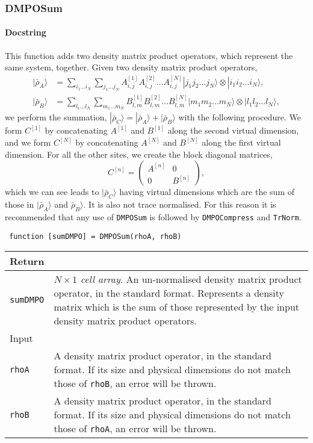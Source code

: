  \subsubsection{DMPOSum}
 \paragraph{Docstring} This function adds two density matrix product operators, which represent the same system, together. Given two density matrix product operators, 
 \begin{align}
 |\bar{\rho}_{A} \rangle &= \sum_{i_{1}\ldots i_{N}} \sum_{j_{1} \ldots j_{N}} A^{[1]}_{i,j} A^{[2]}_{i,j} \ldots A^{[N]}_{i,j} |j_{1} j_{2} \ldots j_{N} \rangle \otimes |i_{1} i_{2} \ldots i_{N} \rangle, \label{eq:vs3-5} \\
 |\bar{\rho}_{B} \rangle &= \sum_{l_{1} \ldots l_{N}} \sum_{m_{1} \ldots m_{N}} B^{[1]}_{l,m} B^{[2]}_{l,m} \ldots B^{[N]}_{l,m} |m_{1} m_{2} \ldots m_{N} \rangle \otimes |l_{1} l_{2} \ldots l_{N} \rangle, \label{eq:vs3-6} 
 \end{align}
 we perform the summation, \(|\bar{\rho}_{C} \rangle = |\bar{\rho}_{A} \rangle + |\bar{\rho}_{B} \rangle\) with the following procedure. We form \(C^{[1]}\) by concatenating \(A^{[1]}\) and \(B^{[1]}\) along the second virtual dimension, and we form \(C^{[N]}\) by concatenating \(A^{[N]}\) and \(B^{[N]}\) along the first virtual dimension. For all the other sites, we create the block diagonal matrices,
 \begin{equation}
 C^{[n]} = \begin{pmatrix}
 A^{[n]} & 0 \\ 
 0 & B^{[n]} \end{pmatrix}, 
 \label{eq:vs3-7}
 \end{equation}
 which we can see leads to \(|\bar{\rho}_{C} \rangle \) having virtual dimensions which are the sum of those in \(|\bar{\rho}_{A}\rangle\) and \(\bar{\rho}_{B}\rangle\). It is also not trace normalised. For this reason it is recommended that any use of \lstinline$DMPOSum$ is followed by \lstinline$DMPOCompress$ and \lstinline$TrNorm$. 
 \begin{lstlisting}
 function [sumDMPO] = DMPOSum(rhoA, rhoB) \end{lstlisting}
 \begin{longtabu}{X[1,l]X[4,l]}
 \hline
 Return & \\ \hline
 \lstinline$sumDMPO$ & \emph{\(N \times 1\) cell array}. An un-normalised density matrix product operator, in the standard format. Represents a density matrix which is the sum of those represented by the input density matrix product operators. \\ \hline
 Input & \\ \hline
 \lstinline$rhoA$ & A density matrix product operator, in the standard format. If its size and physical dimensions do not match those of \lstinline$rhoB$, an error will be thrown. \\ 
 \lstinline$rhoB$ & A density matrix product operator, in the standard format. If its size and physical dimensions do not match those of \lstinline$rhoA$, an error will be thrown. \\ 
 \hline
 \end{longtabu}

